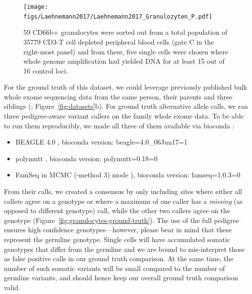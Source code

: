 \documentclass[authoryear,preprint,11pt]{scrartcl}
\begin{document}
\begin{figure}[!tpb]
 \texttt{[image: figs/Laehnemann2017/Laehnemann2017\_Granulozyten\_P.pdf]}
 \caption{
 59 CD66b+ granulocytes were sorted out from a total population of 35779 CD3-T cell depleted peripheral blood cells (gate C in the right-most panel) and from these, five single cells were chosen where whole genome amplification had yielded DNA for at least 15 out of 16 control loci.
 }
 \label{fig:FACS-scheme}
\end{figure}

For the ground truth of this dataset, we could leverage previously published bulk whole exome sequencing data from the same person, their parents and three siblings (\cite{hoell_constitutional_2014}; Figure~\ref{fig:datasets}b).
For ground truth alternative allele calls, we ran three pedigree-aware variant callers on the family whole exome data.
To be able to run them reproducibly, we made all three of them available via bioconda \citep{gruning_bioconda:_2018}:
\begin{itemize}
  \item BEAGLE 4.0 \citep{browning_improving_2013}, bioconda version: {\ttfamily beagle=4.0\_06Jun17=1}
  \item polymutt \citep{li_likelihood-based_2012}, bioconda version: {\ttfamily polymutt=0.18=0}
  \item FamSeq in MCMC ({\ttfamily -method 3}) mode \citep{peng_rare_2013,peng_famseq:_2014}), bioconda version: {\ttfamily famseq=1.0.3=0}
\end{itemize}
From their calls, we created a consensus by only including sites where either all callers agree on a genotype or where a maximum of one caller has a \emph{missing} (as opposed to different genotype) call, while the other two callers agree on the genotype (Figure~\ref{fig:granulocytes-ground-truth}).
The use of the full pedigree ensures high confidence genotypes---however, please bear in mind that these represent the germline genotype.
Single cells will have accumulated somatic genotypes that differ from the germline and we are bound to mis-interpret those as false positive calls in our ground truth comparison.
At the same time, the number of such somatic variants will be small compared to the number of germline variants, and should hence keep our overall ground truth comparison valid.\\
\end{document}
